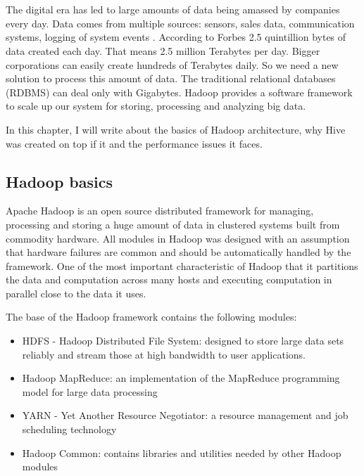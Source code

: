 \chapter{\bevezetes}


The digital era has led to large amounts of data being amassed by companies every day. Data comes from multiple sources: sensors, sales data, communication systems, logging of system events \etc. According to Forbes \cite{Forbes} 2.5 quintillion bytes of data created each day. That means 2.5 million Terabytes per day. Bigger corporations can easily create hundreds of Terabytes daily. So we need a new solution to process this amount of data. The traditional relational databases (RDBMS) can deal only with Gigabytes. Hadoop provides a software framework to scale up our system for storing, processing and analyzing big data.

In this chapter, I will write about the basics of Hadoop architecture, why Hive was created on top if it and the performance issues it faces.

\section{Hadoop basics}
Apache Hadoop is an open source distributed framework for managing, processing  and storing a huge amount of data in clustered systems built from commodity hardware. All modules in Hadoop was designed with an assumption that hardware failures are common and should be automatically handled by the framework. One of the most important characteristic of Hadoop that it partitions the data and computation across many hosts and executing computation in parallel close to the data it uses.  \cite{Hadoop-wiki}

The base of the Hadoop framework contains the following modules:
\begin{itemize}
	\item HDFS - Hadoop Distributed File System: designed to store large data sets reliably and stream those at high bandwidth to user applications.
	\item Hadoop MapReduce: an implementation of the MapReduce programming model for large data processing
	\item YARN - Yet Another Resource Negotiator: a resource management and job scheduling technology
	\item Hadoop Common: contains libraries and utilities needed by other Hadoop modules
\end{itemize}

